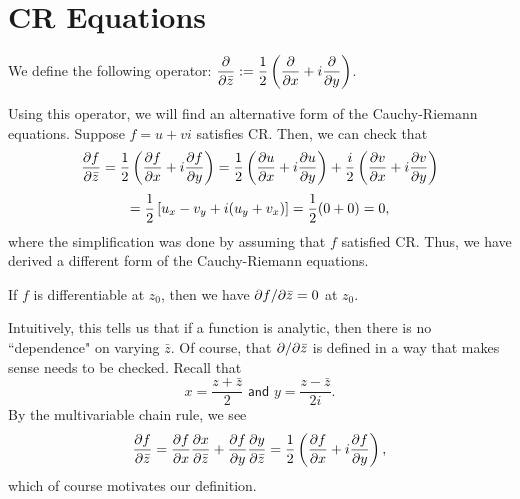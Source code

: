 \documentclass{article}
\begin{document}
\section{CR Equations}
\begin{definition}
We define the following operator: $\displaystyle\frac{\partial}{\partial \bar z} := \frac 12\left(\frac{\partial}{\partial x} + i\frac{\partial} {\partial y} \right)$.
\end{definition}
Using this operator, we will find an alternative form of the Cauchy-Riemann equations. Suppose $f = u+vi$ satisfies CR. Then, we can check that
$$\frac{\partial f}{\partial\bar z} = \frac 12\left( \frac{\partial f}{\partial x} + i\frac{\partial f}{\partial y} \right) = \frac 12\left(\frac{\partial u}{\partial x} + i\frac{\partial u}{\partial y} \right) + \frac i2\left(\frac{\partial v}{\partial x} + i\frac{\partial v}{\partial y} \right)$$
$$=\frac 12\left[u_x -v_y + i(u_y+v_x)\right] = \frac 12(0 + 0) = 0,$$
where the simplification was done by assuming that $f$ satisfied CR. Thus, we have derived a different form of the Cauchy-Riemann equations.
\begin{proposition}
If $f$ is differentiable at $z_0$, then we have $\partial f/\partial \bar z = 0$ at $z_0$.
\end{proposition}
Intuitively, this tells us that if a function is analytic, then there is no ``dependence" on varying $\bar z$. Of course, that $\partial/\partial\bar z$ is defined in a way that makes sense needs to be checked. Recall that 
$$x = \frac{z+\bar z}2 \textsf{ and } y = \frac{z - \bar z}{2i}.$$
By the multivariable chain rule, we see
$$\frac{\partial f}{\partial \bar z} = \frac{\partial f}{\partial x} \frac{\partial x}{\partial \bar z} + \frac{\partial f}{\partial y} \frac{\partial y}{\partial\bar z} = \frac 12\left(\frac{ \partial f}{\partial x} + i\frac{\partial f}{\partial y} \right),$$
which of course motivates our definition.
\end{document}
